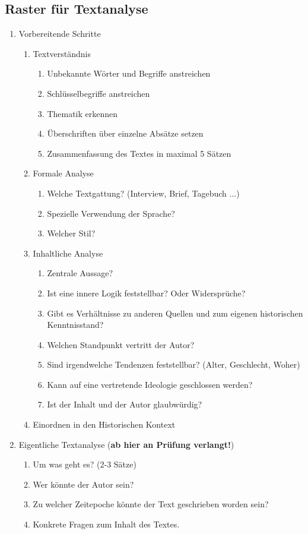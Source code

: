 \documentclass[10pt, openright=true]{scrartcl}
\begin{document}
\subsection{Raster für Textanalyse} \vspace{-0.25cm}
\begin{enumerate} [nosep]
\item Vorbereitende Schritte
	\begin{enumerate} [label=\alph*. , nosep]
	\item Textverständnis
		\begin{enumerate} [label=\roman*. , nosep]
		\item Unbekannte Wörter und Begriffe anstreichen
		\item Schlüsselbegriffe anstreichen
		\item Thematik erkennen
		\item Überschriften über einzelne Absätze setzen
		\item Zusammenfassung des Textes in maximal 5 Sätzen
		\end{enumerate}
	\item Formale Analyse
		\begin{enumerate} [label=\roman*. , nosep]
		\item Welche Textgattung? (Interview, Brief, Tagebuch ...)
		\item Spezielle Verwendung der Sprache?
		\item Welcher Stil?
		\end{enumerate}	
	\item Inhaltliche Analyse
		\begin{enumerate} [label=\roman*. , nosep]
		\item Zentrale Aussage?
		\item Ist eine innere Logik feststellbar? Oder Widersprüche?
		\item Gibt es Verhältnisse zu anderen Quellen und zum eigenen historischen Kenntnisstand?
		\item Welchen Standpunkt vertritt der Autor?
		\item Sind irgendwelche Tendenzen feststellbar? (Alter, Geschlecht, Woher)
		\item Kann auf eine vertretende Ideologie geschlossen werden?
		\item Ist der Inhalt und der Autor glaubwürdig?
		\end{enumerate}	
	\item Einordnen in den Historischen Kontext
	\end{enumerate}
\item Eigentliche Textanalyse (\textbf{ab hier an Prüfung verlangt!})
	\begin{enumerate} [label=\alph*. , nosep]
	\item Um was geht es? (2-3 Sätze)
	\item Wer könnte der Autor sein?
	\item Zu welcher Zeitepoche könnte der Text geschrieben worden sein?
	\item Konkrete Fragen zum Inhalt des Textes.
	\end{enumerate}
\end{enumerate}
\end{document}
